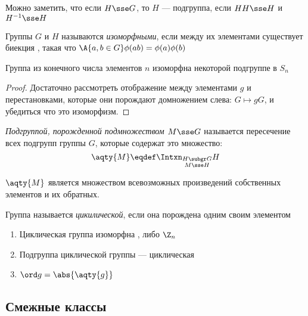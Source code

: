 Можно заметить, что если $H\sse G$, то $H$ --- подгруппа, если $HH\sse H$ и $H^{-1}\sse H$

\begin{definition}
  Группы $G$ и $H$ называются \emph{изоморфными}, если между их элементами существует биекция , такая что $\A{a,b \in G} \phi(ab)=\phi(a)\phi(b)$
\end{definition}

\begin{theorem}[Кэли]
  Группа из конечного числа элементов $n$ изоморфна некоторой подгруппе в $S_n$
\end{theorem}
\begin{proof}
  Достаточно рассмотреть отображение между элементами $g$ и перестановками, которые они порождают домножением слева: $G \mapsto gG$, и убедиться что это изоморфизм.
\end{proof}

\begin{definition}
  \emph{Подгруппой, порожденной подмножеством $M\sse G$} называется пересечение всех подгрупп группы $G$, которые содержат это множество:
  \[\aqty{M}\eqdef \Intxn_{\substack{H\subgr G \\ M\sse H}}H\]
\end{definition}

\begin{theorem}
  $\aqty{M}$ является множеством всевозможных произведений собственных элементов и их обратных.
\end{theorem}

\begin{definition}
  Группа называется \emph{цикилической}, если она порождена одним своим элементом
\end{definition}

\begin{theorem}
  \theoremlistshack
  \begin{enumerate}
    \item Циклическая группа изоморфна \Z, либо $\Z_n$
    \item Подгруппа циклической группы --- циклическая
    \item $\ord g = \abs{\aqty{g}}$
  \end{enumerate}
\end{theorem}



\subsection{Смежные классы}


